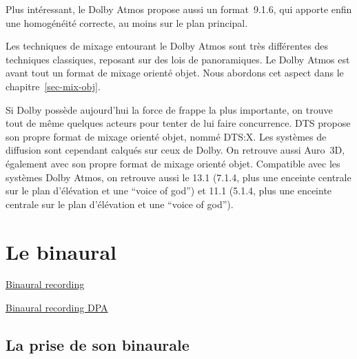 \documentclass[
  letterpaper,
  DIV=11,
  numbers=noendperiod]{scrreprt}
\begin{document}
Plus intéressant, le Dolby Atmos propose aussi un format~9.1.6, qui
apporte enfin une homogénéité correcte, au moins sur le plan principal.

\begin{tcolorbox}[enhanced jigsaw, leftrule=.75mm, arc=.35mm, bottomtitle=1mm, colback=white, colbacktitle=quarto-callout-warning-color!10!white, opacityback=0, left=2mm, rightrule=.15mm, opacitybacktitle=0.6, breakable, toptitle=1mm, titlerule=0mm, bottomrule=.15mm, toprule=.15mm, coltitle=black, title=\textcolor{quarto-callout-warning-color}{\faExclamationTriangle}\hspace{0.5em}{Avertissement}]

Les techniques de mixage entourant le Dolby Atmos sont très différentes
des techniques classiques, reposant sur des lois de panoramiques. Le
Dolby Atmos est avant tout un format de mixage orienté objet. Nous
abordons cet aspect dans le chapitre~\ref{sec-mix-obj}.

\end{tcolorbox}

Si Dolby possède aujourd'hui la force de frappe la plus importante, on
trouve tout de même quelques acteurs pour tenter de lui faire
concurrence. DTS propose son propre format de mixage orienté objet,
nommé DTS:X. Les systèmes de diffusion sont cependant calqués sur ceux
de Dolby. On retrouve aussi Auro~3D, également avec son propre format de
mixage orienté objet. Compatible avec les systèmes Dolby Atmos, on
retrouve aussi le 13.1 (7.1.4, plus une enceinte centrale sur le plan
d'élévation et une ``voice of god'') et 11.1 (5.1.4, plus une enceinte
centrale sur le plan d'élévation et une ``voice of god'').

\hypertarget{le-binaural}{%
\chapter{Le binaural}\label{le-binaural}}

\href{https://en.wikipedia.org/wiki/Binaural_recording}{Binaural
recording}

\href{https://en.wikipedia.org/wiki/Binaural_recording\#/media/File:FrequenzgangDruckempfänger.svg}{Binaural
recording DPA}

\hypertarget{la-prise-de-son-binaurale}{%
\section{La prise de son binaurale}\label{la-prise-de-son-binaurale}}
\end{document}
